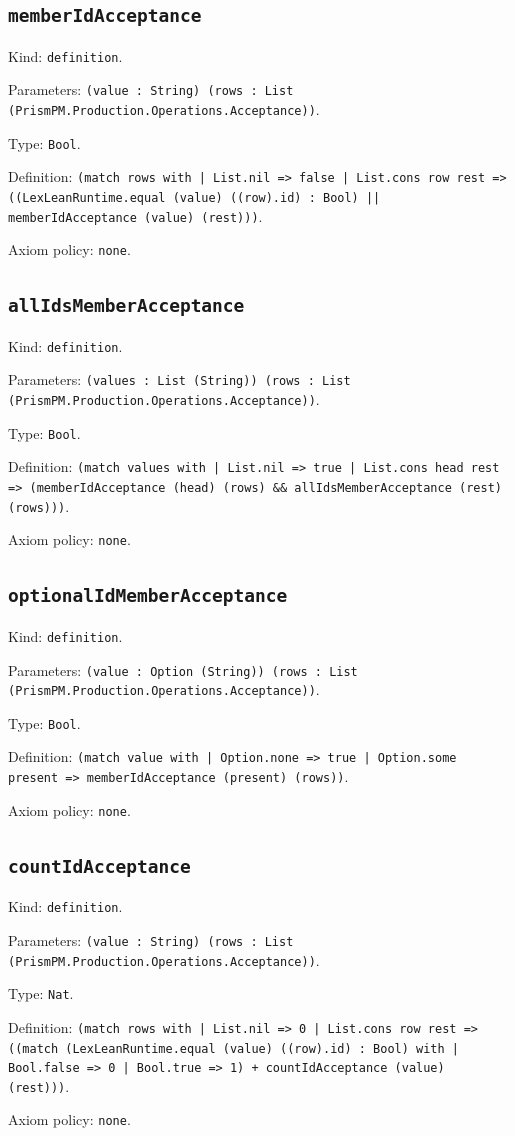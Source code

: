 \documentclass[11pt]{article}
\begin{document}
\subsection*{\texttt{memberIdAcceptance}}
\noindent Kind: \texttt{definition}.\par
\noindent Parameters: \texttt{(value : String) (rows : List (PrismPM.Production.Operations.Acceptance))}.\par
\noindent Type: \texttt{Bool}.\par
\noindent Definition: \texttt{(match rows with | List.nil => false | List.cons row rest => ((LexLeanRuntime.equal (value) ((row).id) : Bool) || memberIdAcceptance (value) (rest)))}.\par
\noindent Axiom policy: \texttt{none}.\par
\subsection*{\texttt{allIdsMemberAcceptance}}
\noindent Kind: \texttt{definition}.\par
\noindent Parameters: \texttt{(values : List (String)) (rows : List (PrismPM.Production.Operations.Acceptance))}.\par
\noindent Type: \texttt{Bool}.\par
\noindent Definition: \texttt{(match values with | List.nil => true | List.cons head rest => (memberIdAcceptance (head) (rows) \&\& allIdsMemberAcceptance (rest) (rows)))}.\par
\noindent Axiom policy: \texttt{none}.\par
\subsection*{\texttt{optionalIdMemberAcceptance}}
\noindent Kind: \texttt{definition}.\par
\noindent Parameters: \texttt{(value : Option (String)) (rows : List (PrismPM.Production.Operations.Acceptance))}.\par
\noindent Type: \texttt{Bool}.\par
\noindent Definition: \texttt{(match value with | Option.none => true | Option.some present => memberIdAcceptance (present) (rows))}.\par
\noindent Axiom policy: \texttt{none}.\par
\subsection*{\texttt{countIdAcceptance}}
\noindent Kind: \texttt{definition}.\par
\noindent Parameters: \texttt{(value : String) (rows : List (PrismPM.Production.Operations.Acceptance))}.\par
\noindent Type: \texttt{Nat}.\par
\noindent Definition: \texttt{(match rows with | List.nil => 0 | List.cons row rest => ((match (LexLeanRuntime.equal (value) ((row).id) : Bool) with | Bool.false => 0 | Bool.true => 1) + countIdAcceptance (value) (rest)))}.\par
\noindent Axiom policy: \texttt{none}.\par
\end{document}
